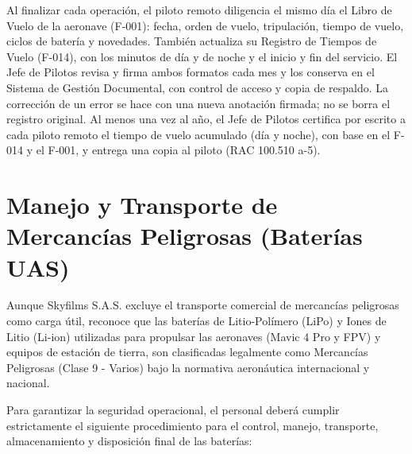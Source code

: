 Al finalizar cada operación, el piloto remoto diligencia el mismo día el Libro de Vuelo de la aeronave (F-001): fecha, orden de vuelo, tripulación, tiempo de vuelo, ciclos de batería y novedades. También actualiza su Registro de Tiempos de Vuelo (F-014), con los minutos de día y de noche y el inicio y fin del servicio. El Jefe de Pilotos revisa y firma ambos formatos cada mes y los conserva en el Sistema de Gestión Documental, con control de acceso y copia de respaldo. La corrección de un error se hace con una nueva anotación firmada; no se borra el registro original. Al menos una vez al año, el Jefe de Pilotos certifica por escrito a cada piloto remoto el tiempo de vuelo acumulado (día y noche), con base en el F-014 y el F-001, y entrega una copia al piloto (RAC 100.510 a-5).

\section{Manejo y Transporte de Mercancías Peligrosas (Baterías UAS)}

Aunque Skyfilms S.A.S. excluye el transporte comercial de mercancías peligrosas como carga útil, reconoce que las baterías de Litio-Polímero (LiPo) y Iones de Litio (Li-ion) utilizadas para propulsar las aeronaves (Mavic 4 Pro y FPV) y equipos de estación de tierra, son clasificadas legalmente como Mercancías Peligrosas (Clase 9 - Varios) bajo la normativa aeronáutica internacional y nacional.

Para garantizar la seguridad operacional, el personal deberá cumplir estrictamente el siguiente procedimiento para el control, manejo, transporte, almacenamiento y disposición final de las baterías:

